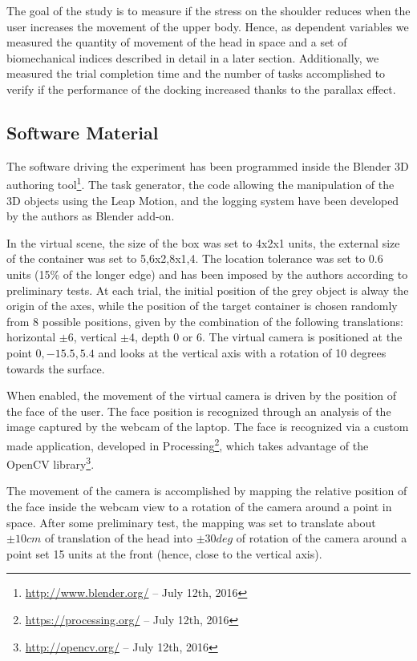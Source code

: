 The goal of the study is to measure if the stress on the shoulder reduces when the user increases the movement of the upper body.
Hence, as dependent variables we measured the quantity of movement of the head in space and a set of biomechanical indices described in detail in a later section.
Additionally, we measured the trial completion time and the number of tasks accomplished to verify if the performance of the docking increased thanks to the parallax effect.


\subsection{Software Material}

The software driving the experiment has been programmed inside the Blender 3D authoring tool\footnote{\url{http://www.blender.org/} -- July 12th, 2016}. The task generator, the code allowing the manipulation of the 3D objects using the Leap Motion, and the logging system have been developed by the authors as Blender add-on.

In the virtual scene, the size of the box was set to 4x2x1 units, the external size of the container was set to 5,6x2,8x1,4. The location tolerance was set to 0.6 units (15\% of the longer edge) and has been imposed by the authors according to preliminary tests. At each trial, the initial position of the grey object is alway the origin of the axes, while the position of the target container is chosen randomly from 8 possible positions, given by the combination of the following translations: horizontal $\pm 6$, vertical $\pm 4$, depth $0$ or $6$.
The virtual camera is positioned at the point $0,-15.5,5.4$ and looks at the vertical axis with a rotation of 10 degrees towards the surface.

When enabled, the movement of the virtual camera is driven by the position of the face of the user. The face position is recognized through an analysis of the image captured by the webcam of the laptop. The face is recognized via a custom made application, developed in Processing\footnote{\url{https://processing.org/} -- July 12th, 2016}, which takes advantage of the OpenCV library\footnote{\url{http://opencv.org/} -- July 12th, 2016}.

The movement of the camera is accomplished by mapping the relative position of the face inside the webcam view to a rotation of the camera around a point in space.
After some preliminary test, the mapping was set to translate about $\pm 10cm$ of translation of the head into $\pm 30deg$ of rotation of the camera around a point set 15 units at the front (hence, close to the vertical axis).

